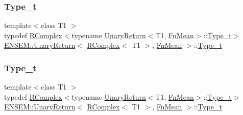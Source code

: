 \subsubsection{\texorpdfstring{Type\_t}{Type\_t}\hspace{0.1cm}{\footnotesize\ttfamily [1/3]}}
{\footnotesize\ttfamily template$<$class T1 $>$ \\
typedef \mbox{\hyperlink{classENSEM_1_1RComplex}{R\+Complex}}$<$typename \mbox{\hyperlink{structENSEM_1_1UnaryReturn}{Unary\+Return}}$<$T1, \mbox{\hyperlink{structENSEM_1_1FnMean}{Fn\+Mean}}$>$\+::\mbox{\hyperlink{structENSEM_1_1UnaryReturn_3_01RComplex_3_01T1_01_4_00_01FnMean_01_4_a36f90d415b22308c1707a2639a538763}{Type\+\_\+t}}$>$ \mbox{\hyperlink{structENSEM_1_1UnaryReturn}{E\+N\+S\+E\+M\+::\+Unary\+Return}}$<$ \mbox{\hyperlink{classENSEM_1_1RComplex}{R\+Complex}}$<$ T1 $>$, \mbox{\hyperlink{structENSEM_1_1FnMean}{Fn\+Mean}} $>$\+::\mbox{\hyperlink{structENSEM_1_1UnaryReturn_3_01RComplex_3_01T1_01_4_00_01FnMean_01_4_a36f90d415b22308c1707a2639a538763}{Type\+\_\+t}}}

\mbox{\label{structENSEM_1_1UnaryReturn_3_01RComplex_3_01T1_01_4_00_01FnMean_01_4_a36f90d415b22308c1707a2639a538763}} 
\subsubsection{\texorpdfstring{Type\_t}{Type\_t}\hspace{0.1cm}{\footnotesize\ttfamily [2/3]}}
{\footnotesize\ttfamily template$<$class T1 $>$ \\
typedef \mbox{\hyperlink{classENSEM_1_1RComplex}{R\+Complex}}$<$typename \mbox{\hyperlink{structENSEM_1_1UnaryReturn}{Unary\+Return}}$<$T1, \mbox{\hyperlink{structENSEM_1_1FnMean}{Fn\+Mean}}$>$\+::\mbox{\hyperlink{structENSEM_1_1UnaryReturn_3_01RComplex_3_01T1_01_4_00_01FnMean_01_4_a36f90d415b22308c1707a2639a538763}{Type\+\_\+t}}$>$ \mbox{\hyperlink{structENSEM_1_1UnaryReturn}{E\+N\+S\+E\+M\+::\+Unary\+Return}}$<$ \mbox{\hyperlink{classENSEM_1_1RComplex}{R\+Complex}}$<$ T1 $>$, \mbox{\hyperlink{structENSEM_1_1FnMean}{Fn\+Mean}} $>$\+::\mbox{\hyperlink{structENSEM_1_1UnaryReturn_3_01RComplex_3_01T1_01_4_00_01FnMean_01_4_a36f90d415b22308c1707a2639a538763}{Type\+\_\+t}}}

